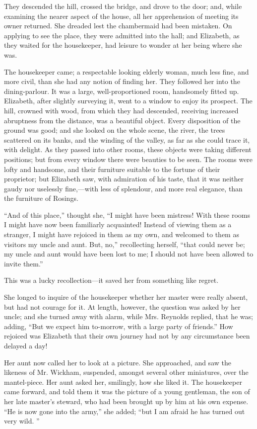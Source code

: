 \documentclass[10pt]{book}
\begin{document}
   They descended the hill, crossed the bridge, and drove to the door; and,
while examining the nearer aspect of the house, all her apprehension of
meeting its owner returned. She dreaded lest the chambermaid had been
mistaken. On applying to see the place, they were admitted into the
hall; and Elizabeth, as they waited for the housekeeper, had leisure to
wonder at her being where she was.
  

   The housekeeper came; a respectable looking elderly woman, much less
fine, and more civil, than she had any notion of finding her. They
followed her into the dining-parlour. It was a large, well-proportioned
room, handsomely fitted up. Elizabeth, after slightly surveying it, went
to a window to enjoy its prospect. The hill, crowned with wood, from
which they had descended, receiving increased abruptness from the
distance, was a beautiful object. Every disposition of the ground was
good; and she looked on the whole scene, the river, the trees scattered
on its banks, and the winding of the valley, as far as she could trace
it, with delight. As they passed into other rooms, these objects were
taking different positions; but
   from every window there were beauties
to be seen. The rooms were lofty and handsome, and their furniture
suitable to the fortune of their proprietor; but Elizabeth saw, with
admiration of his taste, that it was neither gaudy nor uselessly
fine,—with less of splendour, and more real elegance, than the
furniture of Rosings.
  

   “And of this place,” thought she, “I might have been mistress! With
these rooms I might have now been familiarly acquainted! Instead of
viewing them as a stranger, I might have rejoiced in them as my own, and
welcomed to them as visitors my uncle and aunt. But, no,” recollecting
herself, “that could never be; my uncle and aunt would have been lost to
me; I should not have been allowed to invite them.”
  

   This was a lucky recollection—it saved her from something like regret.
  

   She longed to inquire of the housekeeper whether her master were really
absent, but had not courage for it. At length, however, the question was
asked by her uncle; and she turned away with alarm, while Mrs. Reynolds
replied, that he was; adding, “But we expect him to-morrow, with a large
party of friends.” How rejoiced was Elizabeth that their own journey had
not by any circumstance been delayed a day!
  

   Her aunt now called her to look at a picture. She approached, and saw
the likeness of Mr. Wickham, suspended, amongst several other
miniatures, over the mantel-piece. Her aunt asked her, smilingly, how
she liked it. The housekeeper came forward, and told them it was the
picture of a young gentleman, the son of her late master’s steward, who
had been brought up by him at his own expense. “He is now gone into the
army,” she added; “but I am afraid he has turned out very wild.
   ”
  
\end{document}
